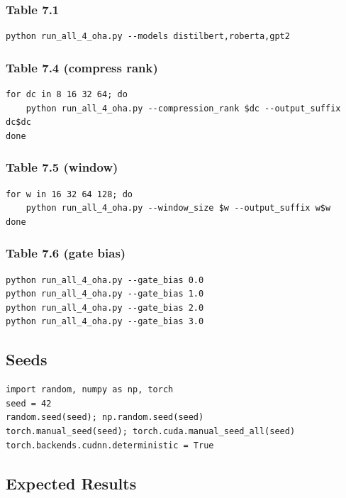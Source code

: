 \subsubsection{Table 7.1}
\begin{lstlisting}
python run_all_4_oha.py --models distilbert,roberta,gpt2
\end{lstlisting}

\subsubsection{Table 7.4 (compress rank)}
\begin{lstlisting}
for dc in 8 16 32 64; do
    python run_all_4_oha.py --compression_rank $dc --output_suffix dc$dc
done
\end{lstlisting}

\subsubsection{Table 7.5 (window)}
\begin{lstlisting}
for w in 16 32 64 128; do
    python run_all_4_oha.py --window_size $w --output_suffix w$w
done
\end{lstlisting}

\subsubsection{Table 7.6 (gate bias)}
\begin{lstlisting}
python run_all_4_oha.py --gate_bias 0.0
python run_all_4_oha.py --gate_bias 1.0
python run_all_4_oha.py --gate_bias 2.0
python run_all_4_oha.py --gate_bias 3.0
\end{lstlisting}

\subsection{Seeds}

\begin{lstlisting}
import random, numpy as np, torch
seed = 42
random.seed(seed); np.random.seed(seed)
torch.manual_seed(seed); torch.cuda.manual_seed_all(seed)
torch.backends.cudnn.deterministic = True
\end{lstlisting}

\subsection{Expected Results}

